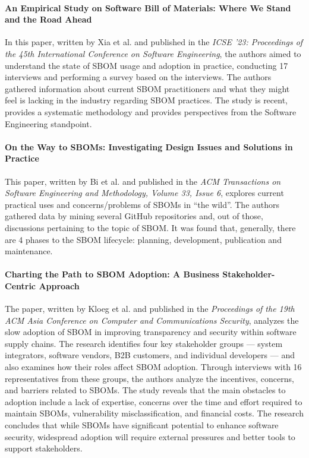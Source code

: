 \paragraph{An Empirical Study on Software Bill of Materials: Where We Stand and the Road Ahead} \cite{article:sbom-study} In this paper, written by Xia et al. and published in the \emph{ICSE '23: Proceedings of the 45th International Conference on Software Engineering}, the authors aimed to understand the state of SBOM usage and adoption in practice, conducting 17 interviews and performing a survey based on the interviews. The authors gathered information about current SBOM practitioners and what they might feel is lacking in the industry regarding SBOM practices. The study is recent, provides a systematic methodology and provides perspectives from the Software Engineering standpoint.

\paragraph{On the Way to SBOMs: Investigating Design Issues and Solutions in Practice} \cite{article:sboms-issues-solutions} This paper, written by Bi et al. and published in the \emph{ACM Transactions on Software Engineering and Methodology, Volume 33, Issue 6}, explores current practical uses and concerns/problems of SBOMs in \enquote{the wild}. The authors gathered data by mining several GitHub repositories and, out of those, discussions pertaining to the topic of SBOM. It was found that, generally, there are 4 phases to the SBOM lifecycle: planning, development, publication and maintenance.

\paragraph{Charting the Path to SBOM Adoption: A Business Stakeholder-Centric Approach} \cite{article:business-sbom} The paper, written by Kloeg et al. and published in the \emph{Proceedings of the 19th ACM Asia Conference on Computer and Communications Security}, analyzes the slow adoption of SBOM in improving transparency and security within software supply chains. The research identifies four key stakeholder groups --- system integrators, software vendors, B2B customers, and individual developers --- and also examines how their roles affect SBOM adoption. Through interviews with 16 representatives from these groups, the authors analyze the incentives, concerns, and barriers related to SBOMs. 
The study reveals that the main obstacles to adoption include a lack of expertise, concerns over the time and effort required to maintain SBOMs, vulnerability misclassification, and financial costs. The research concludes that while SBOMs have significant potential to enhance software security, widespread adoption will require external pressures and better tools to support stakeholders.
